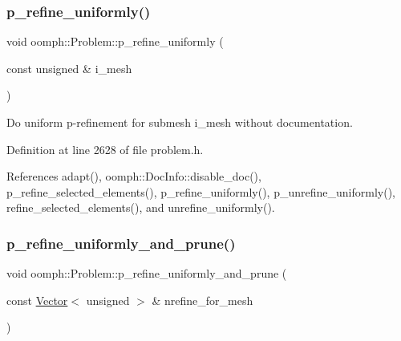 \subsubsection{\texorpdfstring{p\+\_\+refine\+\_\+uniformly()}{p\_refine\_uniformly()}\hspace{0.1cm}{\footnotesize\ttfamily [6/6]}}
{\footnotesize\ttfamily void oomph\+::\+Problem\+::p\+\_\+refine\+\_\+uniformly (\begin{DoxyParamCaption}\item[{const unsigned \&}]{i\+\_\+mesh }\end{DoxyParamCaption})\hspace{0.3cm}{\ttfamily [inline]}}



Do uniform p-\/refinement for submesh i\+\_\+mesh without documentation. 



Definition at line 2628 of file problem.\+h.



References adapt(), oomph\+::\+Doc\+Info\+::disable\+\_\+doc(), p\+\_\+refine\+\_\+selected\+\_\+elements(), p\+\_\+refine\+\_\+uniformly(), p\+\_\+unrefine\+\_\+uniformly(), refine\+\_\+selected\+\_\+elements(), and unrefine\+\_\+uniformly().

\mbox{\label{classoomph_1_1Problem_a5155b2d5436a95b1ee27f914b4eb8f08}} 
\subsubsection{\texorpdfstring{p\+\_\+refine\+\_\+uniformly\+\_\+and\+\_\+prune()}{p\_refine\_uniformly\_and\_prune()}\hspace{0.1cm}{\footnotesize\ttfamily [1/3]}}
{\footnotesize\ttfamily void oomph\+::\+Problem\+::p\+\_\+refine\+\_\+uniformly\+\_\+and\+\_\+prune (\begin{DoxyParamCaption}\item[{const \hyperlink{classoomph_1_1Vector}{Vector}$<$ unsigned $>$ \&}]{nrefine\+\_\+for\+\_\+mesh }\end{DoxyParamCaption})\hspace{0.3cm}{\ttfamily [inline]}}



